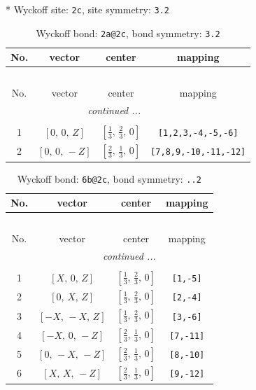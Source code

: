 \documentclass[fleqn,8pt]{jsarticle}
\begin{document}
* Wyckoff site: {\tt 2c}, site symmetry: {\tt 3.2}
\renewcommand{\arraystretch}{1.2}
\begin{longtable}{cccc}
\caption{Wyckoff bond: {\tt 2a@2c}, bond symmetry: {\tt 3.2}}
 \\
 \hline \hline
No. & vector & center & mapping \\ \hline \endfirsthead

\multicolumn{3}{l}{\tablename\ \thetable{}} \\
 \hline \hline
No. & vector & center & mapping \\ \hline \endhead

 \hline \hline
\multicolumn{3}{r}{\footnotesize\it continued ...} \\ \endfoot

 \hline \hline
\multicolumn{3}{r}{} \\ \endlastfoot

1 & $\left[ 0,\, 0,\, Z \right]$ & $\left[ \frac{1}{3},\, \frac{2}{3},\, 0 \right]$ & {\tt [1,2,3,-4,-5,-6]} \\ \hline
2 & $\left[ 0,\, 0,\, - Z \right]$ & $\left[ \frac{2}{3},\, \frac{1}{3},\, 0 \right]$ & {\tt [7,8,9,-10,-11,-12]} \\
\end{longtable}
\renewcommand{\arraystretch}{1.2}
\begin{longtable}{cccc}
\caption{Wyckoff bond: {\tt 6b@2c}, bond symmetry: {\tt ..2}}
 \\
 \hline \hline
No. & vector & center & mapping \\ \hline \endfirsthead

\multicolumn{3}{l}{\tablename\ \thetable{}} \\
 \hline \hline
No. & vector & center & mapping \\ \hline \endhead

 \hline \hline
\multicolumn{3}{r}{\footnotesize\it continued ...} \\ \endfoot

 \hline \hline
\multicolumn{3}{r}{} \\ \endlastfoot

1 & $\left[ X,\, 0,\, Z \right]$ & $\left[ \frac{1}{3},\, \frac{2}{3},\, 0 \right]$ & {\tt [1,-5]} \\ \hline
2 & $\left[ 0,\, X,\, Z \right]$ & $\left[ \frac{1}{3},\, \frac{2}{3},\, 0 \right]$ & {\tt [2,-4]} \\ \hline
3 & $\left[ - X,\, - X,\, Z \right]$ & $\left[ \frac{1}{3},\, \frac{2}{3},\, 0 \right]$ & {\tt [3,-6]} \\ \hline
4 & $\left[ - X,\, 0,\, - Z \right]$ & $\left[ \frac{2}{3},\, \frac{1}{3},\, 0 \right]$ & {\tt [7,-11]} \\ \hline
5 & $\left[ 0,\, - X,\, - Z \right]$ & $\left[ \frac{2}{3},\, \frac{1}{3},\, 0 \right]$ & {\tt [8,-10]} \\ \hline
6 & $\left[ X,\, X,\, - Z \right]$ & $\left[ \frac{2}{3},\, \frac{1}{3},\, 0 \right]$ & {\tt [9,-12]} \\
\end{longtable}
\end{document}
